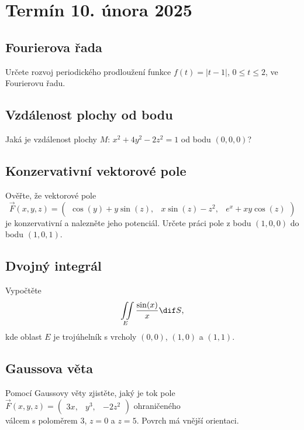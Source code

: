 \section{Termín 10. února 2025}

\subsection{Fourierova řada}
Určete rozvoj periodického prodloužení funkce $f(t) = |t-1|$, $0 \leq t \leq 2$, ve Fourierovu řadu.

\subsection{Vzdálenost plochy od bodu}
Jaká je vzdálenost plochy $M$: $x^2 + 4y^2 - 2z^2 = 1$ od bodu $(0, 0, 0)$?

\subsection{Konzervativní vektorové pole}
Ověřte, že vektorové pole
\[
    \vec{F} (x, y, z) =
    \begin{pmatrix}
        \cos(y) + y \sin(z), & x \sin(z) - z^2, & e^x + xy\cos(z)
    \end{pmatrix}
\]
je konzervativní a nalezněte jeho potenciál. Určete práci pole z bodu $(1, 0, 0)$ do bodu $(1, 0, 1)$.

\subsection{Dvojný integrál}
Vypočtěte
\[
    \iint\limits_{E} \frac{\sin(x)}{x} \dif S \text{,}
\]
kde oblast $E$ je trojúhelník s vrcholy $(0,0)$, $(1,0)$ a $(1,1)$.

\subsection{Gaussova věta}
Pomocí Gaussovy věty zjistěte, jaký je tok pole 
$\vec{F}(x, y, z) =
\begin{pmatrix}
    3x, & y^3, & -2z^2
\end{pmatrix}$
ohraničeného \\ válcem s poloměrem 3, $z=0$ a $z=5$. Povrch má vnější orientaci.
